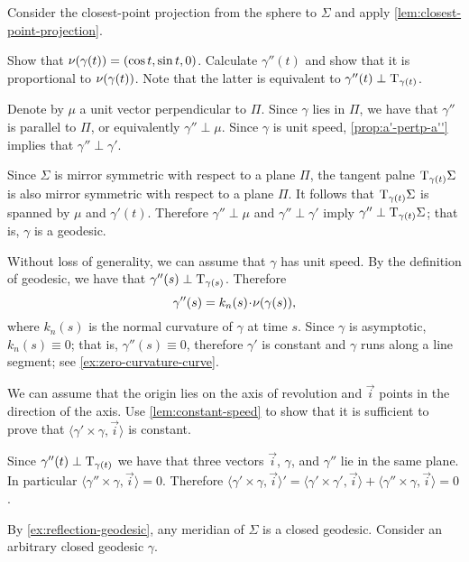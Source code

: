 Consider the closest-point projection from the sphere to $\Sigma$ and apply \ref{lem:closest-point-projection}.

\setcounter{eqtn}{0}

Show that $\nu(\gamma(t))=(\cos t,\sin t, 0)$.
Calculate $\gamma''(t)$ and show that it is proportional to $\nu(\gamma(t))$.
Note that the latter is equivalent to $\gamma''(t)\perp\mathrm{T}_{\gamma(t)}$.

Denote by $\mu$ a unit vector perpendicular to $\Pi$.
Since $\gamma$ lies in $\Pi$, we have that $\gamma''$ is parallel to $\Pi$, or equivalently $\gamma''\perp \mu$.
Since $\gamma$ is unit speed, \ref{prop:a'-pertp-a''} implies that $\gamma''\perp\gamma'$.

Since $\Sigma$ is mirror symmetric with respect to  a plane $\Pi$,
the tangent palne $\mathrm{T}_{\gamma(t)}\Sigma$ is also mirror symmetric with respect to  a plane $\Pi$.
It follows that $\mathrm{T}_{\gamma(t)}\Sigma$ is spanned by $\mu$ and $\gamma'(t)$.
Therefore $\gamma''\perp \mu$ and $\gamma''\perp\gamma'$ imply $\gamma''\perp\mathrm{T}_{\gamma(t)}\Sigma$;
that is, $\gamma$ is a geodesic.

 Without loss of generality, we can assume that $\gamma$ has unit speed.
By the definition of geodesic, we have that $\gamma''(s)\perp\mathrm{T}_{\gamma(s)}$. 
Therefore 
\[\gamma''(s)=k_n(s)\cdot\Norm(\gamma(s)),\]
where $k_n(s)$ is the normal curvature of $\gamma$ at time $s$.
Since $\gamma$ is asymptotic, $k_n(s)\equiv 0$;
that is, $\gamma''(s)\equiv 0$, therefore $\gamma'$ is constant and $\gamma$ runs along a line segment; see \ref{ex:zero-curvature-curve}.

We can assume that the origin lies on the axis of revolution and $\vec i$ points in the direction of the axis.
Use \ref{lem:constant-speed} to show that it is sufficient to prove that 
$\langle\gamma'\times \gamma,\vec i\rangle$
is constant.

Since $\gamma''(t)\perp\mathrm{T}_{\gamma(t)}$ we have that three vectors $\vec i$, $\gamma$, and $\gamma''$ lie in the same plane.
In particular $\langle\gamma''\times \gamma,\vec i\rangle=0$.
Therefore
$
\langle\gamma'\times \gamma,\vec i\rangle'
=
\langle\gamma'\times \gamma',\vec i\rangle+\langle\gamma''\times \gamma,\vec i\rangle =0
$.



By \ref{ex:reflection-geodesic}, any meridian of $\Sigma$ is a closed geodesic.
Consider an arbitrary closed geodesic $\gamma$.

